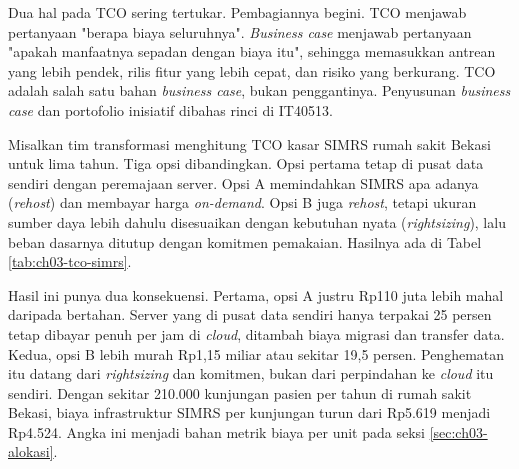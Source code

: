 Dua hal pada TCO sering tertukar. Pembagiannya begini. TCO menjawab pertanyaan "berapa biaya
seluruhnya". \textit{Business case} menjawab pertanyaan "apakah manfaatnya sepadan dengan biaya
itu", sehingga memasukkan antrean yang lebih pendek, rilis fitur yang lebih cepat, dan risiko yang
berkurang. TCO adalah salah satu bahan \textit{business case}, bukan penggantinya. Penyusunan
\textit{business case} dan portofolio inisiatif dibahas rinci di IT40513.

\begin{kasus}[title={Kasus Medikara Health: TCO Kasar SIMRS Rumah Sakit Bekasi}]
  Misalkan tim transformasi menghitung TCO kasar SIMRS rumah sakit Bekasi untuk lima tahun. Tiga
  opsi dibandingkan. Opsi pertama tetap di pusat data sendiri dengan peremajaan server. Opsi A
  memindahkan SIMRS apa adanya (\textit{rehost}) dan membayar harga \textit{on-demand}. Opsi B juga
  \textit{rehost}, tetapi ukuran sumber daya lebih dahulu disesuaikan dengan kebutuhan nyata
  (\textit{rightsizing}), lalu beban dasarnya ditutup dengan komitmen pemakaian. Hasilnya ada di
  Tabel \ref{tab:ch03-tco-simrs}.

  Hasil ini punya dua konsekuensi. Pertama, opsi A justru Rp110 juta lebih mahal daripada bertahan.
  Server yang di pusat data sendiri hanya terpakai 25 persen tetap dibayar penuh per jam di
  \textit{cloud}, ditambah biaya migrasi dan transfer data. Kedua, opsi B lebih murah Rp1,15 miliar
  atau sekitar 19,5 persen. Penghematan itu datang dari \textit{rightsizing} dan komitmen, bukan
  dari perpindahan ke \textit{cloud} itu sendiri. Dengan sekitar 210.000 kunjungan pasien per tahun
  di rumah sakit Bekasi, biaya infrastruktur SIMRS per kunjungan turun dari Rp5.619 menjadi Rp4.524.
  Angka ini menjadi bahan metrik biaya per unit pada seksi \ref{sec:ch03-alokasi}.
\end{kasus}

